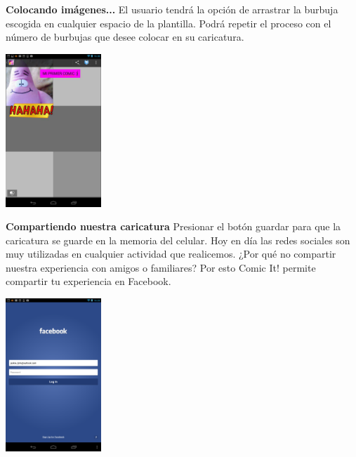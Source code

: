 \documentclass[12pt]{report}
\begin{document}


\begingroup
		\large{
			\textbf{
				Colocando imágenes...
				\newline
				\newline
			}
		}
	\endgroup
El usuario tendrá la opción de arrastrar la burbuja escogida en cualquier espacio de la plantilla. Podrá repetir el proceso con el número de burbujas que desee colocar en su caricatura.
\newline


	\begin{center}
		\begingroup
			\includegraphics[width=0.27\textwidth]{imagenes_usuario/comic.png}
		\endgroup
	\end{center}



\begingroup
		\large{
			\textbf{
				Compartiendo nuestra caricatura
				\newline
				\newline
			}
		}
	\endgroup
Presionar el botón guardar para que la caricatura se guarde en la memoria del celular.
Hoy en día las redes sociales son muy utilizadas en cualquier actividad que realicemos. ¿Por qué no compartir nuestra experiencia con amigos o familiares?
Por esto Comic It! permite compartir tu experiencia en Facebook.
\newline

	\begin{center}
		\begingroup
			\includegraphics[width=0.27\textwidth]{imagenes_usuario/face.png}

		\endgroup
	\end{center}
\end{document}
